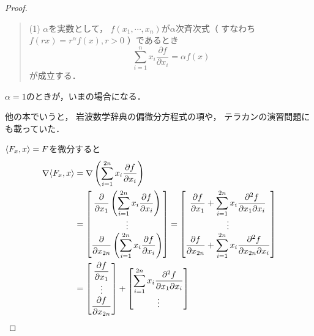 \begin{proof}
{\begin{quotation}
            (1) 
            \(\alpha\)を実数として，
            \(f(x_1,\cdots,x_n)\)が\(\alpha\)次斉次式（
            すなわち\(f(rx)=r^{\alpha}f(x), r>0\)
            ）であるとき\[
                \sum_{i=1}^{n}x_i\dfrac{\partial f}{\partial x_{i}}
                =\alpha f(x)
            \]が成立する．
        \end{quotation}
        \(\alpha=1\)のときが，いまの場合になる．

        他の本でいうと，
        岩波数学辞典の偏微分方程式の項や，
        テラカンの演習問題にも載っていた．
    }\(\inner<F_x,x>=F\)を微分すると
    \begin{align*}
        \nabla\inner<F_x,x>
        &=\nabla\left(
            \sum_{i=1}^{2n}
            x_i\dfrac{\partial f}{\partial x_{i}}
        \right)\\
        &=\begin{bmatrix*}[c]\displaystyle
            \dfrac{\partial}{\partial x_{1}}\left(\sum_{i=1}^{2n}x_i\dfrac{\partial f}{\partial x_{i}}\right)\\
            \vdots\\
            \displaystyle
            \dfrac{\partial}{\partial x_{2n}}\left(\sum_{i=1}^{2n}x_i\dfrac{\partial f}{\partial x_{i}}\right)
        \end{bmatrix*}
        =\begin{bmatrix*}[c]\displaystyle
            \dfrac{\partial f}{\partial x_{1}}
            +
            \sum_{i=1}^{2n}
            x_i\dfrac{\partial^2f}{\partial x_{1}\partial x_{i}}\\
            \vdots\\
            \displaystyle
            \dfrac{\partial f}{\partial x_{2n}}
            +
            \sum_{i=1}^{2n}
            x_i\dfrac{\partial^2f}{\partial x_{2n}\partial x_{i}}
        \end{bmatrix*}\\
        &=\begin{bmatrix*}[c]\displaystyle
            \dfrac{\partial f}{\partial x_{1}}\\
            \vdots\\
            \displaystyle
            \dfrac{\partial f}{\partial x_{2n}}
        \end{bmatrix*}
        +
        \begin{bmatrix*}[c]\displaystyle
            \sum_{i=1}^{2n}
            x_i\dfrac{\partial^2f}{\partial x_{1}\partial x_{i}}\\
            \vdots\\

\end{bmatrix*}
\end{align*}
\end{proof}
